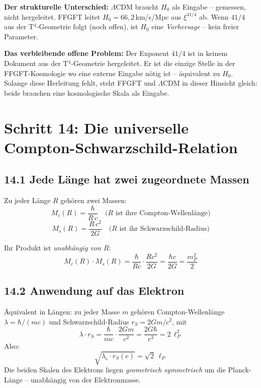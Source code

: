 \textbf{Der strukturelle Unterschied:}
$\Lambda$CDM braucht $H_0$ als Eingabe -- gemessen, nicht hergeleitet.
FFGFT leitet $H_0 = 66{,}2$\,km/s/Mpc aus $\xi^{41/4}$ ab.
Wenn $41/4$ aus der T$^4$-Geometrie folgt (noch offen),
ist $H_0$ eine \emph{Vorhersage} -- kein freier Parameter.

\textbf{Das verbleibende offene Problem:}
Der Exponent $41/4$ ist in keinem Dokument aus der T$^4$-Geometrie
hergeleitet. Er ist die einzige Stelle in der FFGFT-Kosmologie
wo eine externe Eingabe nötig ist -- äquivalent zu $H_0$.
Solange diese Herleitung fehlt, steht FFGFT und $\Lambda$CDM
in dieser Hinsicht gleich: beide brauchen eine kosmologische
Skala als Eingabe.

\section{Schritt 14: Die universelle Compton-Schwarzschild-Relation}

\subsection*{14.1 Jede Länge hat zwei zugeordnete Massen}

Zu jeder Länge $R$ gehören zwei Massen:
\[
  M_c(R) = \frac{\hbar}{R\,c}
  \quad\text{(}R\text{ ist ihre Compton-Wellenlänge)}
\]
\[
  M_s(R) = \frac{R\,c^2}{2G}
  \quad\text{(}R\text{ ist ihr Schwarzschild-Radius)}
\]

Ihr Produkt ist \emph{unabhängig von $R$}:
\[
  \boxed{M_c(R)\cdot M_s(R)
  = \frac{\hbar}{Rc}\cdot\frac{Rc^2}{2G}
  = \frac{\hbar c}{2G}
  = \frac{m_P^2}{2}}
\]

\subsection*{14.2 Anwendung auf das Elektron}

Äquivalent in Längen: zu jeder Masse $m$ gehören Compton-Wellenlänge
$\lambda = \hbar/(mc)$ und Schwarzschild-Radius $r_S = 2Gm/c^2$, mit
\[
  \lambda \cdot r_S = \frac{\hbar}{mc}\cdot\frac{2Gm}{c^2}
  = \frac{2G\hbar}{c^3} = 2\,\ell_P^2
\]
Also:
\[
  \sqrt{\lambda_e \cdot r_S(e)} = \sqrt{2}\,\ell_P
\]
Die beiden Skalen des Elektrons liegen \emph{geometrisch symmetrisch}
um die Planck-Länge -- unabhängig von der Elektronmasse.

